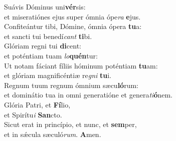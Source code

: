 \evenverse Suávis Dóminus uni\textbf{vér}sis:~\*\\
\evenverse et miseratiónes ejus super ómnia ópe\textit{ra} \textbf{e}jus.\\
\oddverse Confiteántur tibi, Dómine, ómnia ópera \textbf{tu}a:~\*\\
\oddverse et sancti tui benedí\textit{cant} \textbf{ti}bi.\\
\evenverse Glóriam regni tui \textbf{di}cent:~\*\\
\evenverse et poténtiam tuam \textit{lo}\textbf{quén}tur:\\
\oddverse Ut notam fáciant fíliis hóminum poténtiam \textbf{tu}am:~\*\\
\oddverse et glóriam magnificéntiæ re\textit{gni} \textbf{tu}i.\\
\evenverse Regnum tuum regnum ómnium sæcu\textbf{ló}rum:~\*\\
\evenverse et dominátio tua in omni generatióne et genera\textit{ti}\textbf{ó}nem.\\
\oddverse Glória Patri, et \textbf{Fí}lio,~\*\\
\oddverse et Spirítu\textit{i} \textbf{San}cto.\\
\evenverse Sicut erat in princípio, et nunc, et \textbf{sem}per,~\*\\
\evenverse et in sǽcula sæculó\textit{rum}. \textbf{A}men.\\
